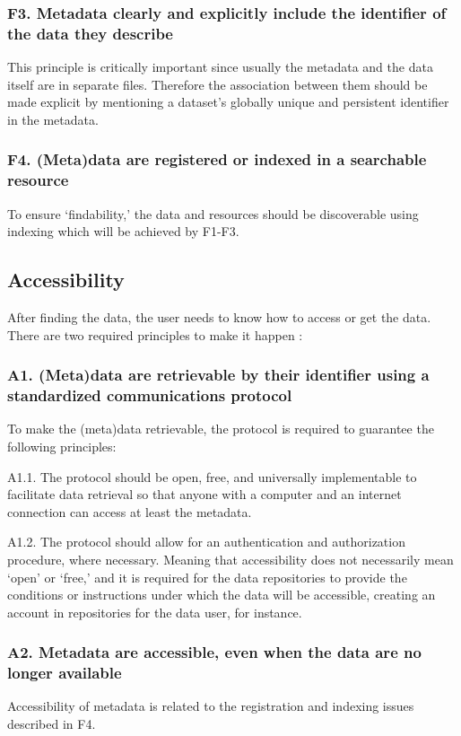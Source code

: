 \subsubsection*{F3. Metadata clearly and explicitly include the identifier of the data they describe}
This principle is critically important since usually the metadata and the data itself are in separate files. Therefore the association between them should be made explicit by mentioning a dataset's globally unique and persistent identifier in the metadata. 
\subsubsection*{F4. (Meta)data are registered or indexed in a searchable resource}
To ensure `findability,' the data and resources should be discoverable using indexing which will be achieved by F1-F3.

\subsection*{Accessibility}
After finding the data, the user needs to know how to access or get the data. There are two required principles to make it happen :

\subsubsection*{A1. (Meta)data are retrievable by their identifier using a standardized communications protocol}
To make the (meta)data retrievable, the protocol is required to guarantee the following principles: 

\quad A1.1. The protocol should be open, free, and universally implementable to facilitate data retrieval so that anyone with a computer and an internet connection can access at least the metadata.

\quad A1.2. The protocol should allow for an authentication and authorization procedure, where necessary. Meaning that accessibility does not necessarily mean `open' or `free,' and it is required for the data repositories to provide the conditions or instructions under which the data will be accessible, creating an account in repositories for the data user, for instance.

\subsubsection*{A2. Metadata are accessible, even when the data are no longer available}  Accessibility of metadata is related to the registration and indexing issues described in F4. 


